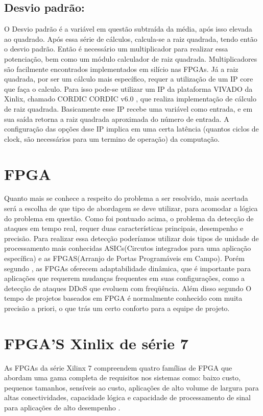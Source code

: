 \subsection {Desvio padrão:} O Desvio padrão é a variável em questão subtraída da média, após isso elevada ao quadrado. Após essa série de cálculos, calcula-se a raiz quadrada, tendo então o desvio padrão. Então é necessário um multiplicador para realizar essa potenciação, bem como um módulo calculador de raiz quadrada. Multiplicadores são facilmente encontrados implementados em silício nas FPGAs. Já a raiz quadrada, por ser um cálculo mais específico, requer a utilização de um IP core que faça o calculo. Para isso pode-se utilizar um  IP da plataforma VIVADO da Xinlix, chamado CORDIC {CORDIC v6.0} , que realiza  implementação de cálculo de raiz quadrada. Basicamente esse IP recebe uma variável como entrada, e em sua saída retorna a raiz quadrada aproximada do número de entrada. A configuração das opções dsse IP implica em uma certa latência (quantos ciclos de clock, são necessários para um termino de operação) da computação.



\section{FPGA}
Quanto mais se conhece a respeito do problema a ser resolvido, mais acertada será a escolha de que tipo de abordagem se deve utilizar, para acomodar a lógica do problema em questão. Como foi pontuado acima, o problema da detecção de ataques em tempo real, requer duas características principais, desempenho e precisão. Para realizar essa detecção poderíamos utilizar dois tipos de unidade de processamento mais conhecidas ASICs(Circutos integrados para uma aplicação específica) e as FPGAS(Arranjo de Portas Programáveis em Campo). Porém segundo , as FPGAs oferecem adaptabilidade dinâmica, que é importante para aplicações que requerem mudanças frequentes em suas configurações, como a detecção de ataques DDoS que evoluem com freqüência. Além disso segundo  O tempo de projetos baseados em FPGA é normalmente conhecido com muita precisão a priori, o que trás um certo conforto para a equipe de projeto.




\section{FPGA'S Xinlix de série 7}
As FPGAs da série Xilinx 7 compreendem quatro famílias de FPGA que abordam uma gama completa de requisitos nos sistemas como: baixo custo, pequenos tamanhos, sensíveis ao custo, aplicações de alto volume de largura para altas conectividades, capacidade lógica e capacidade de processamento de sinal para aplicações de alto desempenho \cite{przybus2010xilinx}.

